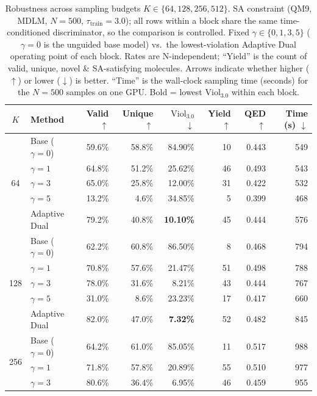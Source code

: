 \documentclass{article}
\begin{document}
\begin{table}[H]
\centering
\caption{Robustness across sampling budgets $K\in\{64,128,256,512\}$. SA constraint (QM9, MDLM, $N{=}500$, $\tau_{\text{train}}{=}3.0$); all rows within a block share the same time-conditioned discriminator, so the comparison is controlled. Fixed $\gamma\in\{0,1,3,5\}$ ($\gamma{=}0$ is the unguided base model) vs.\ the lowest-violation Adaptive Dual operating point of each block. Rates are N-independent; ``Yield'' is the count of valid, unique, novel \& SA-satisfying molecules. Arrows indicate whether higher ($\uparrow$) or lower ($\downarrow$) is better. ``Time'' is the wall-clock sampling time (seconds) for the $N{=}500$ samples on one GPU. Bold = lowest $\mathrm{Viol}_{3.0}$ within each block.}
\label{tab:steps}
\begin{tabular}{cl rrrrrr}
\toprule
$K$ & Method & Valid $\uparrow$ & Unique $\uparrow$ & $\mathrm{Viol}_{3.0}$ $\downarrow$ & Yield $\uparrow$ & QED $\uparrow$ & Time (s) $\downarrow$ \\
\midrule
\multirow{5}{*}{64}
  & Base ($\gamma{=}0$) & 59.6\% & 58.8\% & 84.90\% & 10 & 0.443 & 549 \\
  & $\gamma{=}1$        & 64.8\% & 51.2\% & 25.62\% & 46 & 0.493 & 543 \\
  & $\gamma{=}3$        & 65.0\% & 25.8\% & 12.00\% & 31 & 0.422 & 532 \\
  & $\gamma{=}5$        & 13.2\% & 4.6\%  & 34.85\% & 5  & 0.399 & 468 \\
  & Adaptive Dual       & 79.2\% & 40.8\% & \textbf{10.10\%} & 45 & 0.444 & 576 \\
\midrule
\multirow{5}{*}{128}
  & Base ($\gamma{=}0$) & 62.2\% & 60.8\% & 86.50\% & 8  & 0.468 & 794 \\
  & $\gamma{=}1$        & 70.8\% & 57.6\% & 21.47\% & 51 & 0.498 & 788 \\
  & $\gamma{=}3$        & 78.0\% & 31.6\% & 8.21\%  & 43 & 0.444 & 767 \\
  & $\gamma{=}5$        & 31.0\% & 8.6\%  & 23.23\% & 17 & 0.417 & 660 \\
  & Adaptive Dual       & 82.0\% & 47.0\% & \textbf{7.32\%}  & 52 & 0.482 & 845 \\
\midrule
\multirow{5}{*}{256}
  & Base ($\gamma{=}0$) & 64.2\% & 61.0\% & 85.05\% & 11 & 0.517 & 988 \\
  & $\gamma{=}1$        & 71.8\% & 57.8\% & 20.89\% & 55 & 0.510 & 977 \\
  & $\gamma{=}3$        & 80.6\% & 36.4\% & 6.95\%  & 46 & 0.459 & 955 \\

\end{tabular}
\end{table}
\end{document}
